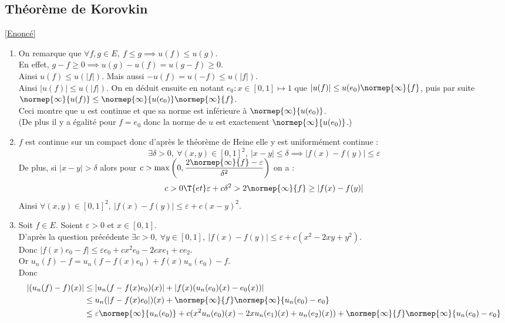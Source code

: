\documentclass{book}
\begin{document}
	\subsection{Théorème de Korovkin }
	\label{Théorème de Korovkin corrigé}
	\textcolor{blue}{\hyperref[Théorème de Korovkin]{[Enoncé]}}\\
	\begin{enumerate}[leftmargin=*]
		\item On remarque que $\forall f,g\in E,\ f\leq g\implies u(f)\leq u(g)$.\\
		En effet, $g-f\geq 0\implies u(g)-u(f)=u(g-f)\geq 0$.\\
		Ainsi $u(f)\leq u(|f|)$. Mais aussi $-u(f)=u(-f)\leq u(|f|)$.\\
		Ainsi $|u(f)|\leq u(|f|)$. On en déduit ensuite en notant $e_0:x\in [0,1]\mapsto 1$ que $|u(f)|\leq u(e_0)\normep{\infty}{f}$, puis par suite $\normep{\infty}{u(f)}\leq \normep{\infty}{u(e_0)}\normep{\infty}{f}$.\\
		Ceci montre que $u$ est continue et que sa norme est inférieure à $\normep{\infty}{u(e_0)}$.\\
		(De plus il y a égalité pour $f=e_0$ donc la norme de $u$ est exactement $\normep{\infty}{u(e_0)}$.)
		\item $f$ est continue sur un compact donc d'après le théorème de Heine elle y est uniformément continue :
		$$\exists \delta>0,\ \forall (x,y)\in [0,1]^2,\ |x-y|\leq \delta\implies |f(x)-f(y)|\leq \varepsilon$$
		De plus, si $|x-y|>\delta$ alors pour $c>\max\left(0,\dfrac{2\normep{\infty}{f}-\varepsilon}{\delta^2}\right)$ on a :
		$$c>0 \T{ et } \varepsilon+c\delta^2>2\normep{\infty}{f}\geq |f(x)-f(y)|$$
		Ainsi $\forall (x,y)\in [0,1]^2,\ |f(x)-f(y)|\leq \varepsilon+c(x-y)^2$.
		\item Soit $f\in E$. Soient $\varepsilon>0$ et $x\in [0,1]$.\\
		D'après la question précédente $\exists c>0,\ \forall y\in [0,1],\ |f(x)-f(y)|\leq \varepsilon+c(x^2-2xy+y^2)$.\\
		Donc $|f(x)e_0-f|\leq \varepsilon e_0+cx^2e_0-2cxe_1+ce_2$.\\
		Or $u_n(f)-f=u_n(f-f(x)e_0)+f(x)u_n(e_0)-f$.\\
		Donc 
		\begin{align*}
			|(u_n(f)-f)(x)|&\leq |u_n(f-f(x)e_0)(x)|+|f(x)(u_n(e_0)(x)-e_0(x))|\\
			&\leq u_n(|f-f(x)e_0|)(x)+\normep{\infty}{f}\normep{\infty}{u_n(e_0)-e_0}\\
			&\leq \varepsilon \normep{\infty}{u_n(e_0)}+c(x^2u_n(e_0)(x)-2xu_n(e_1)(x)+u_n(e_2)(x))+\normep{\infty}{f}\normep{\infty}{u_n(e_0)-e_0}

\end{align*}
\end{enumerate}
\end{document}
